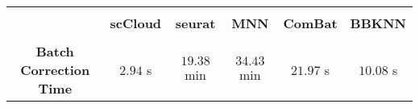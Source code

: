 \documentclass{article}
\begin{document}
\begin{center}
\begin{tabular}{|c|c|c|c|c|c|}\hline
& & & & & \\[-10pt]
 & \textbf{scCloud} & \textbf{seurat} & \textbf{MNN} & \textbf{ComBat} & \textbf{BBKNN }\\[2pt]\hline
 & & & & & \\[-10pt]
 \textbf{Batch Correction Time} & $2.94$ s & $19.38$ min & $34.43$ min & $21.97$ s & $10.08$ s  \\[2pt]\hline
\end{tabular}
\end{center}
\end{document}
